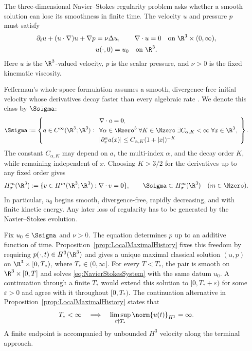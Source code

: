 The three-dimensional Navier--Stokes regularity problem asks whether a smooth solution can lose its smoothness in finite time.
The velocity \(u\) and pressure \(p\) must satisfy
\begin{equation}\label{eq:NavierStokesSystem}
  \begin{gathered}
    \partial_tu+(u\cdot\nabla)u+\nabla p=\nu\Delta u,
    \qquad
    \nabla\cdot u=0
    \quad\text{on }\R^3\times(0,\infty),
    \\
    u(\cdot,0)=u_0
    \quad\text{on }\R^3.
  \end{gathered}
\end{equation}
Here \(u\) is the \(\R^3\)-valued velocity, \(p\) is the scalar pressure, and \(\nu>0\) is the fixed kinematic viscosity.

Fefferman's whole-space formulation assumes a smooth, divergence-free initial velocity whose derivatives decay faster than every algebraic rate \parencite{Fefferman2000}.
We denote this class by \(\Ssigma\):
\begin{equation}\label{eq:FeffermanDatumClass}
  \Ssigma
  :=
  \left\{
  a\in C^\infty(\R^3;\R^3):
  \begin{array}{l}
    \nabla\cdot a=0,\\[0.3em]
    \forall\alpha\in\Nzero^3\;
    \forall K\in\Nzero\;
    \exists C_{\alpha,K}<\infty\;
    \forall x\in\R^3,\\[0.3em]
    |\partial_x^\alpha a(x)|
    \leq C_{\alpha,K}(1+|x|)^{-K}
  \end{array}
  \right\}.
\end{equation}
The constant \(C_{\alpha,K}\) may depend on \(a\), the multi-index \(\alpha\), and the decay order \(K\), while remaining independent of \(x\).
Choosing \(K>3/2\) for the derivatives up to any fixed order gives
\[
  H^m_\sigma(\R^3)
  :=\{v\in H^m(\R^3;\R^3):\nabla\cdot v=0\},
  \qquad
  \Ssigma\subset H^m_\sigma(\R^3)
  \quad(m\in\Nzero).
\]
In particular, \(u_0\) begins smooth, divergence-free, rapidly decreasing, and with finite kinetic energy.
Any later loss of regularity has to be generated by the Navier--Stokes evolution.

Fix \(u_0\in\Ssigma\) and \(\nu>0\).
The equation determines \(p\) up to an additive function of time.
Proposition~\ref{prop:LocalMaximalHistory} fixes this freedom by requiring \(p(\cdot,t)\in H^3(\R^3)\) and gives a unique maximal classical solution \((u,p)\) on \(\R^3\times[0,T_*)\), where \(T_*\in(0,\infty]\).
For every \(T<T_*\), the pair is smooth on \(\R^3\times[0,T]\) and solves \eqref{eq:NavierStokesSystem} with the same datum \(u_0\).
A continuation through a finite \(T_*\) would extend this solution to \([0,T_*+\varepsilon)\) for some \(\varepsilon>0\) and agree with it throughout \([0,T_*)\).
The continuation alternative in Proposition~\ref{prop:LocalMaximalHistory} states that
\[
  T_*<\infty
  \quad\Longrightarrow\quad
  \limsup_{t\uparrow T_*}\norm{u(t)}_{H^3}=\infty.
\]
A finite endpoint is accompanied by unbounded \(H^3\) velocity along the terminal approach.

